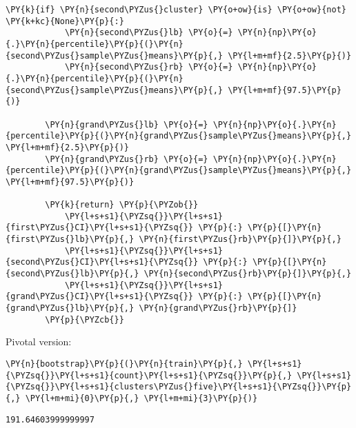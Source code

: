 \begin{tcolorbox}[breakable, size=fbox, boxrule=1pt, pad at break*=1mm,colback=cellbackground, colframe=cellborder]
\begin{Verbatim}[commandchars=\\\{\}]
        \PY{k}{if} \PY{n}{second\PYZus{}cluster} \PY{o+ow}{is} \PY{o+ow}{not} \PY{k+kc}{None}\PY{p}{:}
            \PY{n}{second\PYZus{}lb} \PY{o}{=} \PY{n}{np}\PY{o}{.}\PY{n}{percentile}\PY{p}{(}\PY{n}{second\PYZus{}sample\PYZus{}means}\PY{p}{,} \PY{l+m+mf}{2.5}\PY{p}{)}
            \PY{n}{second\PYZus{}rb} \PY{o}{=} \PY{n}{np}\PY{o}{.}\PY{n}{percentile}\PY{p}{(}\PY{n}{second\PYZus{}sample\PYZus{}means}\PY{p}{,} \PY{l+m+mf}{97.5}\PY{p}{)}
        
        \PY{n}{grand\PYZus{}lb} \PY{o}{=} \PY{n}{np}\PY{o}{.}\PY{n}{percentile}\PY{p}{(}\PY{n}{grand\PYZus{}sample\PYZus{}means}\PY{p}{,} \PY{l+m+mf}{2.5}\PY{p}{)}
        \PY{n}{grand\PYZus{}rb} \PY{o}{=} \PY{n}{np}\PY{o}{.}\PY{n}{percentile}\PY{p}{(}\PY{n}{grand\PYZus{}sample\PYZus{}means}\PY{p}{,} \PY{l+m+mf}{97.5}\PY{p}{)}
        
        \PY{k}{return} \PY{p}{\PYZob{}}
            \PY{l+s+s1}{\PYZsq{}}\PY{l+s+s1}{first\PYZus{}CI}\PY{l+s+s1}{\PYZsq{}} \PY{p}{:} \PY{p}{[}\PY{n}{first\PYZus{}lb}\PY{p}{,} \PY{n}{first\PYZus{}rb}\PY{p}{]}\PY{p}{,}
            \PY{l+s+s1}{\PYZsq{}}\PY{l+s+s1}{second\PYZus{}CI}\PY{l+s+s1}{\PYZsq{}} \PY{p}{:} \PY{p}{[}\PY{n}{second\PYZus{}lb}\PY{p}{,} \PY{n}{second\PYZus{}rb}\PY{p}{]}\PY{p}{,}
            \PY{l+s+s1}{\PYZsq{}}\PY{l+s+s1}{grand\PYZus{}CI}\PY{l+s+s1}{\PYZsq{}} \PY{p}{:} \PY{p}{[}\PY{n}{grand\PYZus{}lb}\PY{p}{,} \PY{n}{grand\PYZus{}rb}\PY{p}{]}
        \PY{p}{\PYZcb{}}
\end{Verbatim}
\end{tcolorbox}

    Pivotal version:

    \begin{tcolorbox}[breakable, size=fbox, boxrule=1pt, pad at break*=1mm,colback=cellbackground, colframe=cellborder]
\begin{Verbatim}[commandchars=\\\{\}]
\PY{n}{bootstrap}\PY{p}{(}\PY{n}{train}\PY{p}{,} \PY{l+s+s1}{\PYZsq{}}\PY{l+s+s1}{count}\PY{l+s+s1}{\PYZsq{}}\PY{p}{,} \PY{l+s+s1}{\PYZsq{}}\PY{l+s+s1}{clusters\PYZus{}five}\PY{l+s+s1}{\PYZsq{}}\PY{p}{,} \PY{l+m+mi}{0}\PY{p}{,} \PY{l+m+mi}{3}\PY{p}{)}
\end{Verbatim}
\end{tcolorbox}

    \begin{Verbatim}[commandchars=\\\{\}]
191.64603999999997
    \end{Verbatim}


